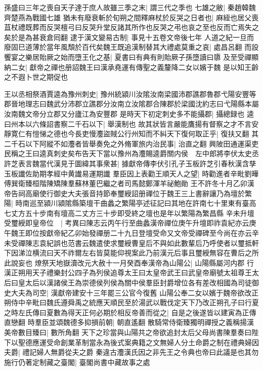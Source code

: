 孫盛曰三年之喪自天子達于庶人故雖三季之末|{
	謂三代之季也}
七雄之敝|{
	秦趙韓魏齊楚燕為戰國七雄}
猶未有廢衰斬於旬朔之間釋麻杖於反哭之日者也|{
	麻絰也居父喪苴杖禮既葬而反哭檀弓曰反哭升堂反諸其所作也反哭之弔也哀之至也反而亡焉失之矣於是為甚衰倉囘翻}
逮于漢文變易古制|{
	事見十五卷文帝後七年}
人道之紀一旦而廢固巳道薄於當年風頹於百代矣魏王既追漢制替其大禮處莫重之哀|{
	處昌呂翻}
而設饗宴之樂居貽厥之始而墮王化之基|{
	夏書曰有典有則貽厥子孫墮讀曰隳}
及至受禪顯納二女|{
	獻帝之禪也册詔魏王曰漢承堯運有傳聖之義釐降二女以嬪于魏}
是以知王齡之不遐卜世之期促也

王以丞相祭酒賈逵為豫州刺史|{
	豫州統潁川汝隂汝南梁國沛郡譙郡魯郡弋陽安豐等郡晉地理志曰魏武分沛郡立譙郡分汝南立汝隂郡合陳郡於梁國沈約志曰弋陽縣本屬汝南魏文帝分立郡又分廬江為安豐郡}
是時天下初定刺史多不能攝郡|{
	攝總録也}
逵曰州本以六條詔書察二千石以下|{
	舉漢制也}
故其狀皆言嚴能鷹揚有督察之才不言安靜寛仁有愷悌之德也今長吏慢灋盜賊公行州知而不糾天下復何取正乎|{
	復扶又翻}
其二千石以下阿縱不如灋者皆舉奏免之外脩軍旅内治民事|{
	治直之翻}
興陂田通運渠吏民稱之王曰逵真刺史矣布告天下當以豫州為灋賜逵爵關内侯　左中郎將李伏太史丞許芝表言魏當代漢見于圖緯其事衆甚|{
	據獻帝傳李伏引孔子玉板許芝引春秋漢含孳玉板䜟佐助期孝經中黄䜟易運期䜟}
羣臣因上表勸王順天人之望|{
	時勸進者辛毗劉曄傅巽衛臻桓階陳矯陳羣蘇林董巴繼之者司馬懿鄭渾羊祕鮑勛}
王不許冬十月乙卯漢帝告祠高廟使行御史大夫張音持節奉璽綬詔册禪位于魏王三上書辭讓乃為壇於繁陽|{
	時南巡至潁川潁隂縣築壇干曲蠡之繁陽亭述征記曰其地在許南七十里東有臺高七丈方五十步南有壇高二丈方三十步即受終之壇也是年以繁陽為繁昌縣}
辛未升壇受璽綬即皇帝位　|{
	考異曰陳志云丙午行至曲蠡漢帝禪位庚午升壇即祚袁紀亦云庚午魏王即位按獻帝紀乙卯始發禪册二十九日登壇受命又文帝受禪碑至今尚在亦云辛未受禪陳志袁紀誤也范書云魏遣使求璽綬曹皇后不與如此數輩后乃呼使者以璽抵軒下因涕泣横流曰天不祚爾左右皆莫能仰視案此乃前漢元后事且璽綬無容在曹后之所此說妄也}
燎祭天地嶽瀆改元大赦十一月癸酉奉漢帝為山陽公|{
	山陽縣屬河内郡}
行漢正朔用天子禮樂封公四子為列侯追尊太王曰太皇帝武王曰武皇帝廟號太祖尊王太后曰皇太后以漢諸侯王為崇德侯列侯為關中侯羣臣封爵增位各有差改相國為司徒御史大夫為司空|{
	漢獻帝建安十三年罷三公官今復舊}
山陽公奉二女以嬪于魏帝欲改正朔侍中辛毗曰魏氏遵舜禹之統應天順民至於湯武以戰伐定天下乃改正朔孔子曰行夏之時左氏傳曰夏數為得天正何必期於相反帝善而從之|{
	自是之後遂皆以建寅為正傳直戀翻}
時羣臣並頌魏德多抑損前朝|{
	朝直遙翻}
散騎常侍衛臻獨明禪授之義稱揚漢美帝數目臻曰|{
	數所角翻}
天下之珍當與山陽共之帝欲追封太后父母尚書陳羣奏曰陛下以聖德應運受命創業革制當永為後式案典籍之文無婦人分土命爵之制在禮典婦因夫爵|{
	禮記婦人無爵從夫之爵}
秦違古灋漢氏因之非先王之令典也帝曰此議是也其勿施行仍著定制藏之臺閣|{
	臺閣尚書中藏故事之處}
